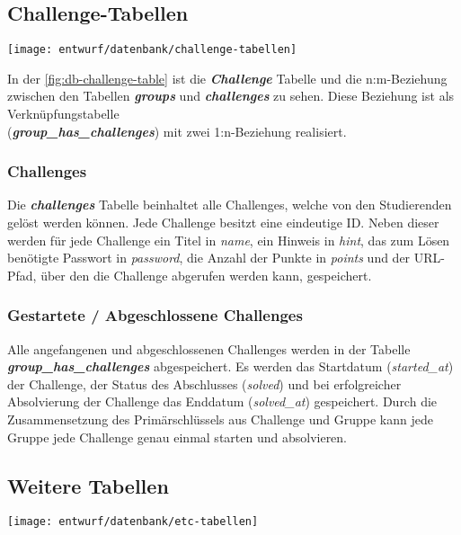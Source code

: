 \subsection{Challenge-Tabellen}
\begin{center}
	\texttt{[image: entwurf/datenbank/challenge-tabellen]}
	\label{fig:db-challenge-table}
\end{center}
In der \autoref{fig:db-challenge-table} ist die \textbf{\textit{Challenge}} Tabelle und die n:m-Beziehung zwischen den Tabellen \textbf{\textit{groups}} und \textbf{\textit{challenges}} zu sehen. Diese Beziehung ist als Verknüpfungstabelle\\ (\textbf{\textit{group\_has\_challenges}}) mit zwei 1:n-Beziehung realisiert.

\subsubsection{Challenges}
Die \textbf{\textit{challenges}} Tabelle beinhaltet alle Challenges, welche von den Studierenden gelöst werden können. Jede Challenge besitzt eine eindeutige ID. Neben dieser werden für jede Challenge ein Titel in \textit{name}, ein Hinweis in \textit{hint}, das zum Lösen benötigte Passwort in \textit{password}, die Anzahl der Punkte in \textit{points} und der URL-Pfad, über den die Challenge abgerufen werden kann, gespeichert.

\subsubsection{Gestartete / Abgeschlossene Challenges}
Alle angefangenen und abgeschlossenen Challenges werden in der Tabelle \\
\textbf{\textit{group\_has\_challenges}} abgespeichert. Es werden das Startdatum (\textit{started\_at}) der Challenge, der Status des Abschlusses (\textit{solved}) und bei erfolgreicher Absolvierung der Challenge das Enddatum (\textit{solved\_at}) gespeichert. Durch die Zusammensetzung des Primärschlüssels aus Challenge und Gruppe kann jede Gruppe jede Challenge genau einmal starten und absolvieren.

\subsection{Weitere Tabellen}
\begin{center}
	\texttt{[image: entwurf/datenbank/etc-tabellen]}
	\label{fig:db-etc-table}
\end{center}

